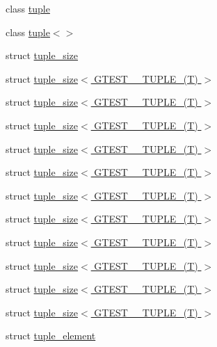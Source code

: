 \begin{DoxyCompactItemize}
\item 
class \hyperlink{classstd_1_1tr1_1_1tuple}{tuple}
\item 
class \hyperlink{classstd_1_1tr1_1_1tuple_3_4}{tuple$<$$>$}
\item 
struct \hyperlink{structstd_1_1tr1_1_1tuple__size}{tuple\-\_\-size}
\item 
struct \hyperlink{structstd_1_1tr1_1_1tuple__size_3_01_g_t_e_s_t__0___t_u_p_l_e___07_t_08_01_4}{tuple\-\_\-size$<$ G\-T\-E\-S\-T\-\_\-\_\-\-T\-U\-P\-L\-E\-\_\-(\-T) $>$}
\item 
struct \hyperlink{structstd_1_1tr1_1_1tuple__size_3_01_g_t_e_s_t__1___t_u_p_l_e___07_t_08_01_4}{tuple\-\_\-size$<$ G\-T\-E\-S\-T\-\_\-\_\-\-T\-U\-P\-L\-E\-\_\-(\-T) $>$}
\item 
struct \hyperlink{structstd_1_1tr1_1_1tuple__size_3_01_g_t_e_s_t__2___t_u_p_l_e___07_t_08_01_4}{tuple\-\_\-size$<$ G\-T\-E\-S\-T\-\_\-\_\-\-T\-U\-P\-L\-E\-\_\-(\-T) $>$}
\item 
struct \hyperlink{structstd_1_1tr1_1_1tuple__size_3_01_g_t_e_s_t__3___t_u_p_l_e___07_t_08_01_4}{tuple\-\_\-size$<$ G\-T\-E\-S\-T\-\_\-\_\-\-T\-U\-P\-L\-E\-\_\-(\-T) $>$}
\item 
struct \hyperlink{structstd_1_1tr1_1_1tuple__size_3_01_g_t_e_s_t__4___t_u_p_l_e___07_t_08_01_4}{tuple\-\_\-size$<$ G\-T\-E\-S\-T\-\_\-\_\-\-T\-U\-P\-L\-E\-\_\-(\-T) $>$}
\item 
struct \hyperlink{structstd_1_1tr1_1_1tuple__size_3_01_g_t_e_s_t__5___t_u_p_l_e___07_t_08_01_4}{tuple\-\_\-size$<$ G\-T\-E\-S\-T\-\_\-\_\-\-T\-U\-P\-L\-E\-\_\-(\-T) $>$}
\item 
struct \hyperlink{structstd_1_1tr1_1_1tuple__size_3_01_g_t_e_s_t__6___t_u_p_l_e___07_t_08_01_4}{tuple\-\_\-size$<$ G\-T\-E\-S\-T\-\_\-\_\-\-T\-U\-P\-L\-E\-\_\-(\-T) $>$}
\item 
struct \hyperlink{structstd_1_1tr1_1_1tuple__size_3_01_g_t_e_s_t__7___t_u_p_l_e___07_t_08_01_4}{tuple\-\_\-size$<$ G\-T\-E\-S\-T\-\_\-\_\-\-T\-U\-P\-L\-E\-\_\-(\-T) $>$}
\item 
struct \hyperlink{structstd_1_1tr1_1_1tuple__size_3_01_g_t_e_s_t__8___t_u_p_l_e___07_t_08_01_4}{tuple\-\_\-size$<$ G\-T\-E\-S\-T\-\_\-\_\-\-T\-U\-P\-L\-E\-\_\-(\-T) $>$}
\item 
struct \hyperlink{structstd_1_1tr1_1_1tuple__size_3_01_g_t_e_s_t__9___t_u_p_l_e___07_t_08_01_4}{tuple\-\_\-size$<$ G\-T\-E\-S\-T\-\_\-\_\-\-T\-U\-P\-L\-E\-\_\-(\-T) $>$}
\item 
struct \hyperlink{structstd_1_1tr1_1_1tuple__size_3_01_g_t_e_s_t__10___t_u_p_l_e___07_t_08_01_4}{tuple\-\_\-size$<$ G\-T\-E\-S\-T\-\_\-\_\-\-T\-U\-P\-L\-E\-\_\-(\-T) $>$}
\item 
struct \hyperlink{structstd_1_1tr1_1_1tuple__element}{tuple\-\_\-element}
\end{DoxyCompactItemize}
